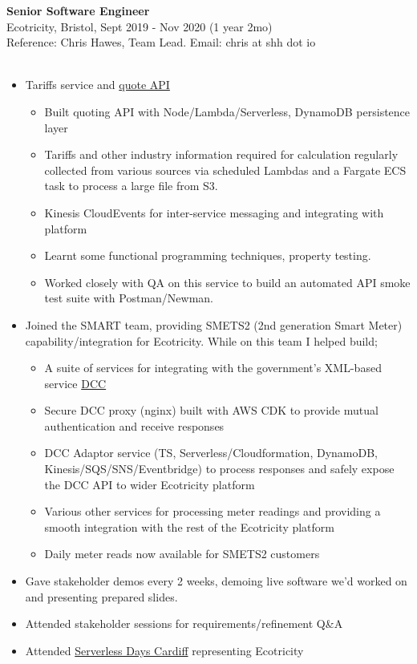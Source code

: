 \documentclass[overlap, line, 10pt]{res} %
\begin{document}
\begin{resume}
\textbf{Senior Software Engineer}\\
Ecotricity, Bristol, Sept 2019 - Nov 2020 (1 year 2mo) \\
Reference: Chris Hawes, Team Lead. Email: chris at shh dot io\\\\
\begin{itemize} \itemsep -1pt
\item Tariffs service and \href{https://join.ecotricity.co.uk/for-your-home/quote-and-switch}{quote API}
\begin{itemize} \itemsep -1pt
\item Built quoting API with Node/Lambda/Serverless, DynamoDB persistence layer
\item Tariffs and other industry information required for calculation regularly collected from various sources via scheduled Lambdas and a Fargate ECS task to process a large file from S3.
\item Kinesis CloudEvents for inter-service messaging and integrating with platform
\item Learnt some functional programming techniques, property testing.
\item Worked closely with QA on this service to build an automated API smoke test suite with Postman/Newman.
\end{itemize}
\item Joined the SMART team, providing SMETS2 (2nd generation Smart Meter) capability/integration for Ecotricity. While on this team I helped build; 
\begin{itemize}
\item A suite of services for integrating with the government's XML-based service \href{https://www.smartdcc.co.uk/}{DCC} 
\item Secure DCC proxy (nginx) built with AWS CDK to provide mutual authentication and receive responses
\item DCC Adaptor service (TS, Serverless/Cloudformation, DynamoDB, Kinesis/SQS/SNS/Eventbridge) to process responses and safely expose the DCC API to wider Ecotricity platform
\item Various other services for processing meter readings and providing a smooth integration with the rest of the Ecotricity platform
\item Daily meter reads now available for SMETS2 customers
\end{itemize}
\item Gave stakeholder demos every 2 weeks, demoing live software we'd worked on and presenting prepared slides.
\item Attended stakeholder sessions for requirements/refinement Q\&A
\item Attended \href{https://cardiff.serverlessdays.io/}{Serverless Days Cardiff} representing Ecotricity
\end{itemize}



\end{resume}
\end{document}

